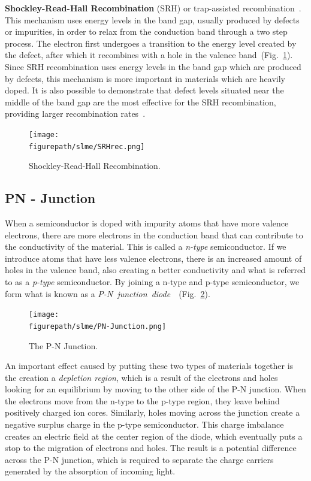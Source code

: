 \begin{refsection}
\textbf{Shockley-Read-Hall Recombination} (SRH) or trap-assisted 
recombination~\cite{Shockley1952}\cite{Hall1952}. This mechanism uses energy 
levels in the band gap, usually produced by defects or impurities, in order to 
relax from the conduction band through a two step process. The electron first 
undergoes a transition to the energy level created by the defect, after which 
it recombines with a hole in the valence band~(Fig.~\ref{slme:fig-SRHrec}). 
Since SRH recombination uses energy levels in the band gap which are produced 
by defects, this mechanism is more important in materials which are heavily 
doped. It is also possible to demonstrate that defect levels situated near the 
middle of the band gap are the most effective for the SRH recombination, 
providing larger recombination rates~\cite{Green1981}. 
\begin{figure}[ht]  
\centering 
\texttt{[image: \\figurepath/slme/SRHrec.png]} 
\caption{\label{slme:fig-SRHrec}Shockley-Read-Hall Recombination.} 
\end{figure} 

\subsection{PN - Junction} 
 
When a semiconductor is doped with impurity atoms that have more valence 
electrons, there are more electrons in the conduction band that can contribute 
to the conductivity of the material. This is called a \textit{n-type} 
semiconductor. If we introduce atoms that have less valence electrons, there 
is an increased amount of holes in the valence band, also creating a better 
conductivity and what is referred to as a \textit{p-type} semiconductor. By 
joining a n-type and p-type semiconductor, we form what is known as a 
\textit{P-N~junction~diode}~\cite{Shockley1949}~(Fig.~\ref{slme:fig-PNjunction}). 
 
\begin{figure}[ht]
\centering 
\captionsetup{width=0.8\textwidth}
\texttt{[image: \\figurepath/slme/PN-Junction.png]} 
\caption{\label{slme:fig-PNjunction} The P-N Junction. \cite{wikigraph}} 
\end{figure} 
 
An important effect caused by putting these two types of materials together is 
the creation a \textit{depletion region}, which is a result of the electrons 
and holes looking for an equilibrium by moving to the other side of the P-N 
junction. When the electrons move from the n-type to the p-type region, they 
leave behind positively charged ion cores. Similarly, holes moving across the 
junction create a negative surplus charge in the p-type semiconductor. This 
charge imbalance creates an electric field at the center region of the diode, 
which eventually puts a stop to the migration of electrons and holes. The 
result is a potential difference across the P-N junction, which is required to 
separate the charge carriers generated by the absorption of incoming light. 
 

\end{refsection}
